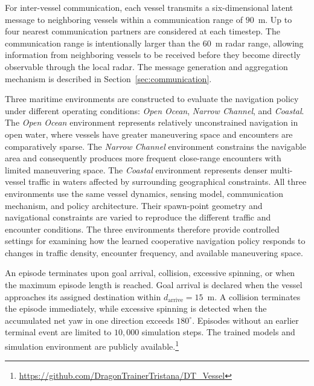 \documentclass[final,5p,times,twocolumn]{elsarticle}
\begin{document}
{For inter-vessel communication, each vessel transmits a six-dimensional
latent message to neighboring vessels within a communication range of
$90$~m. Up to four nearest communication partners are considered at
each timestep. The communication range is intentionally larger than the
$60$~m radar range, allowing information from neighboring vessels to be
received before they become directly observable through the local radar.
The message generation and aggregation mechanism is described in
Section~\ref{sec:communication}.

Three maritime environments are constructed to evaluate the navigation
policy under different operating conditions: \emph{Open Ocean},
\emph{Narrow Channel}, and \emph{Coastal}. The \emph{Open Ocean}
environment represents relatively unconstrained navigation in open
water, where vessels have greater maneuvering space and encounters are
comparatively sparse. The \emph{Narrow Channel} environment constrains
the navigable area and consequently produces more frequent close-range
encounters with limited maneuvering space. The \emph{Coastal}
environment represents denser multi-vessel traffic in waters affected
by surrounding geographical constraints. All three environments use the
same vessel dynamics, sensing model, communication mechanism, and policy
architecture. Their spawn-point geometry and navigational constraints
are varied to reproduce the different traffic and encounter conditions.
The three environments therefore provide controlled settings for
examining how the learned cooperative navigation policy responds to
changes in traffic density, encounter frequency, and available
maneuvering space.

An episode terminates upon goal arrival, collision, excessive spinning,
or when the maximum episode length is reached. Goal arrival is declared
when the vessel approaches its assigned destination within
$d_{\mathrm{arrive}}=15$~m. A collision terminates the episode
immediately, while excessive spinning is detected when the accumulated
net yaw in one direction exceeds $180^\circ$. Episodes without an
earlier terminal event are limited to $10{,}000$ simulation steps. The
trained models and simulation environment are publicly
available.\footnote{\url{https://github.com/DragonTrainerTristana/DT_Vessel}}

}
\end{document}
